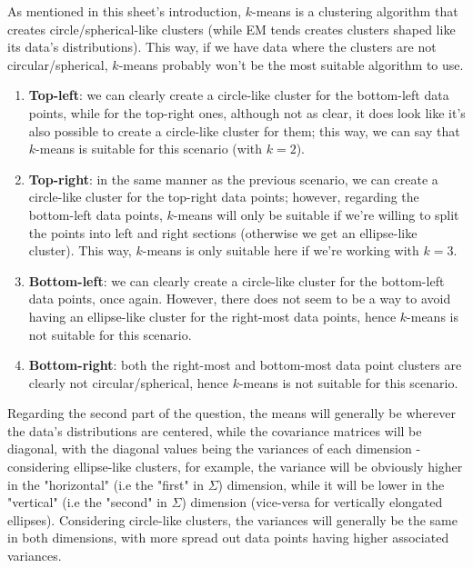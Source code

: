 \documentclass[12pt]{article}
\begin{document}
\begin{enumerate}[leftmargin=\labelsep]
\begin{tcolorbox}[enhanced jigsaw,halign=center,colback=bg,boxrule=0pt,arc=1pt]
  \end{tcolorbox}

  As mentioned in this sheet's introduction, $k$-means is a clustering algorithm that
  creates circle/spherical-like clusters (while EM tends creates clusters shaped
  like its data's distributions). This way, if we have data where the clusters are
  not circular/spherical, $k$-means probably won't be the most suitable algorithm
  to use.

  \begin{enumerate}
    \item \textbf{Top-left}: we can clearly create a circle-like cluster for the
          bottom-left data points, while for the top-right ones, although not as clear,
          it does look like it's also possible to create a circle-like cluster for them;
          this way, we can say that $k$-means is suitable for this scenario (with $k=2$).
    \item \textbf{Top-right}: in the same manner as the previous scenario, we can
          create a circle-like cluster for the top-right data points; however, regarding
          the bottom-left data points, $k$-means will only be suitable if we're willing
          to split the points into left and right sections (otherwise we get an ellipse-like
          cluster). This way, $k$-means is only suitable here if we're working with $k=3$.
    \item \textbf{Bottom-left}: we can clearly create a circle-like cluster for the
          bottom-left data points, once again. However, there does not seem to be a way to
          avoid having an ellipse-like cluster for the right-most data points, hence
          $k$-means is not suitable for this scenario.
    \item \textbf{Bottom-right}: both the right-most and bottom-most data point clusters
          are clearly not circular/spherical, hence $k$-means is not suitable for this scenario.
  \end{enumerate}
\end{enumerate}

Regarding the second part of the question, the means will generally be wherever
the data's distributions are centered, while the covariance matrices will be
diagonal, with the diagonal values being the variances of each dimension - considering
ellipse-like clusters, for example, the variance will be obviously higher in the
"horizontal" (i.e the "first" in $\Sigma$) dimension, while it will be lower in the
"vertical" (i.e the "second" in $\Sigma$) dimension (vice-versa for vertically
elongated ellipses). Considering circle-like clusters, the variances will generally
be the same in both dimensions, with more spread out data points having higher
associated variances.
\end{document}
